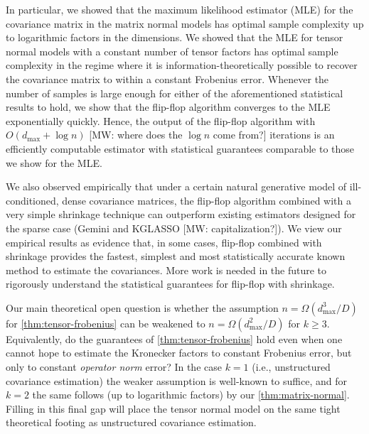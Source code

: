 \documentclass[aos]{imsart}
\theoremstyle{definition}
\numberwithin{equation}{section}
\def\dmax{d_{\max}}
\newcommand{\MW}[1]{{\color{red}[MW: #1]}}
\newcommand{\MW}[1]{{}}
\begin{document}
In particular, we showed that the maximum likelihood estimator (MLE) for the covariance matrix in the matrix normal models has optimal sample complexity up to logarithmic factors in the dimensions.
We showed that the MLE for tensor normal models with a constant number of tensor factors has optimal sample complexity in the regime where it is information-theoretically possible to recover the covariance matrix to within a constant Frobenius error.
Whenever the number of samples is large enough for either of the aforementioned statistical results to hold, we show that the flip-flop algorithm converges to the MLE exponentially quickly.
Hence, the output of the flip-flop algorithm with $O\left(\dmax +  \log n \right)$ \MW{where does the $\log n$ come from?} iterations is an efficiently computable estimator with statistical guarantees comparable to those we show for the MLE.

We also observed empirically that under a certain natural generative model of ill-conditioned, dense covariance matrices, the flip-flop algorithm combined with a very simple shrinkage technique can outperform existing estimators designed for the sparse case (Gemini and KGLASSO \MW{capitalization?}).
We view our empirical results as evidence that, in some cases, flip-flop combined with shrinkage provides the fastest, simplest and most statistically accurate known method to estimate the covariances.
More work is needed in the future to rigorously understand the statistical guarantees for flip-flop with shrinkage.


Our main theoretical open question is whether the assumption $n = \Omega( \dmax^3/ D)$ for \cref{thm:tensor-frobenius} can be weakened to $n = \Omega( \dmax^2/ D)$ for $k \geq 3$.
Equivalently, do the guarantees of \cref{thm:tensor-frobenius} hold even when one cannot hope to estimate the Kronecker factors to constant Frobenius error, but only to constant \emph{operator norm} error?
In the case $k = 1$ (i.e., unstructured covariance estimation) the weaker assumption is well-known to suffice, and for $k = 2$ the same follows (up to logarithmic factors) by our \cref{thm:matrix-normal}.
Filling in this final gap will place the tensor normal model on the same tight theoretical footing as unstructured covariance estimation.
\end{document}
